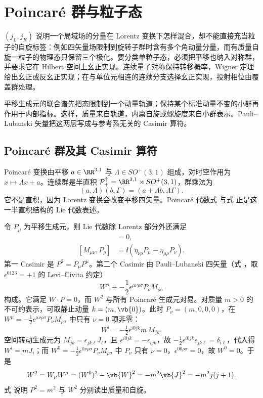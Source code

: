 \section{Poincar\'e 群与粒子态}
\label{chap:lorentz-poincare}

$(j_L,j_R)$ 说明一个局域场的分量在 Lorentz 变换下怎样混合，却不能直接充当粒子的自旋标签：例如四矢量场限制到旋转子群时含有多个角动量分量，而有质量自旋一粒子的物理态只保留三个极化。要分类单粒子态，必须把平移也纳入对称群，并要求它在 Hilbert 空间上幺正实现。连续量子对称保持转移概率，Wigner 定理给出幺正或反幺正实现；在与单位元相连的连续分支选择幺正实现，投射相位由覆盖群处理。

平移生成元的联合谱先把态限制到一个动量轨道；保持某个标准动量不变的小群再作用于内部指标。这样，质量来自轨道，内禀自旋或螺旋度来自小群表示。Pauli--Lubanski 矢量把这两层写成与参考系无关的 Casimir 算符。

\subsection{Poincar\'e 群及其 Casimir 算符}

Poincar\'e 变换由平移 $a\in\RR^{3,1}$ 与 $\Lambda\in SO^+(3,1)$ 组成，对时空作用为 $x\mapsto\Lambda x+a$。连续群是半直积 $\mathcal P_+^\uparrow=\RR^{3,1}\rtimes SO^+(3,1)$，群乘法为
\[
(a,\Lambda)(b,\Gamma)=(a+\Lambda b,\Lambda\Gamma).
\]
它不是直积，因为 Lorentz 变换会改变平移四矢量。Poincar\'e 代数式  与式  正是这一半直积结构的 Lie 代数表述。

令 $P_\mu$ 为平移生成元，则 Lie 代数除 Lorentz 部分外还满足
\begin{align}
[P_\mu,P_\nu]&=0,
\label{eq:poincare-algebra-1}\\
[M_{\mu\nu},P_\rho]
&=\ii(\eta_{\nu\rho}P_\mu-\eta_{\mu\rho}P_\nu).
\label{eq:poincare-algebra-2}
\end{align}
第一 Casimir 是 $P^2=P_\mu P^\mu$。第二个 Casimir 由 Pauli--Lubanski 四矢量（式 ，取 $\epsilon^{0123}=+1$ 的 Levi--Civita 约定）
\begin{equation}
W^\mu\equiv-\frac12\epsilon^{\mu\nu\rho\sigma}P_\nu M_{\rho\sigma}
\label{eq:pauli-lubanski}
\end{equation}
构成。它满足 $W\cdot P=0$，而 $W^2$ 与所有 Poincar\'e 生成元对易。对质量 $m>0$ 的不可约表示，可取静止动量 $k=(m,\vb{0})$。此时 $P_\nu=(m,0,0,0)$，在 $W^\mu=-\tfrac12\epsilon^{\mu\nu\rho\sigma}P_\nu M_{\rho\sigma}$ 中只有 $\nu=0$ 项非零：
\[
W^i=-\tfrac12\epsilon^{i0jk}m\,M_{jk}.
\]
空间转动生成元为 $M_{jk}=\epsilon_{jk\ell}J_\ell$，且 $\epsilon^{i0jk}=-\epsilon_{ijk}$，故 $-\tfrac12\epsilon^{i0jk}\epsilon_{jk\ell}=\delta_{i\ell}$，代入得 $W^i=mJ_i$；而 $W^0=-\tfrac12\epsilon^{0\nu\rho\sigma}P_\nu M_{\rho\sigma}$ 中 $P_\nu$ 只有 $\nu=0$，$\epsilon^{00\rho\sigma}=0$，故 $W^0=0$。于是
\begin{equation}
W^2=W_\mu W^\mu=(W^0)^2-\vb{W}^2=-m^2\vb{J}^2=-m^2j(j+1).
\label{eq:W2-massive}
\end{equation}
式 说明 $P^2=m^2$ 与 $W^2$ 分别读出质量和自旋。

